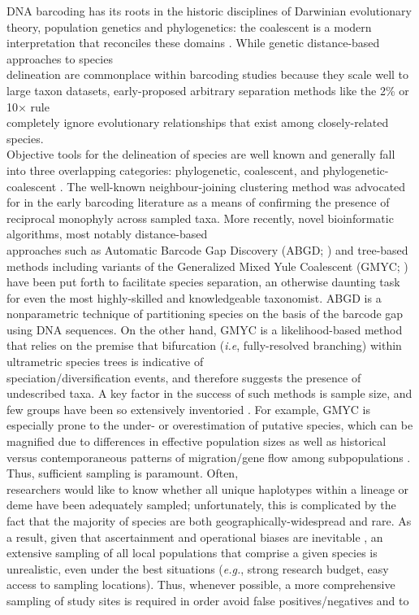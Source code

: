 DNA barcoding has its roots in the historic disciplines of Darwinian evolutionary \\ theory, population genetics and phylogenetics: the coalescent is a modern interpretation that reconciles these domains \cite{rosenberg2002genealogical}. While genetic distance-based approaches to species \\ delineation are commonplace within barcoding studies because they scale well to large taxon datasets, early-proposed arbitrary separation methods like the 2\% or 10$\times$ rule \\ completely ignore evolutionary relationships that exist among closely-related species. \\ Objective tools for the delineation of species are well known and generally fall into three overlapping categories: phylogenetic, coalescent, and phylogenetic-coalescent \cite{hubert2015dna}. The well-known neighbour-joining clustering method was advocated for in the early barcoding literature as a means of confirming the presence of reciprocal monophyly across sampled taxa. More recently, novel bioinformatic algorithms, most notably distance-based \\ approaches such as Automatic Barcode Gap Discovery (ABGD; \cite{puillandre2011abgd}) and tree-based \\ methods including variants of the Generalized Mixed Yule Coalescent (GMYC; \cite{monaghan2009accelerated, pons2006sequence}) have been put forth to facilitate species separation, an otherwise daunting task for even the most highly-skilled and knowledgeable taxonomist. ABGD is a nonparametric technique of partitioning species on the basis of the barcode gap using DNA sequences. On the other hand, GMYC is a likelihood-based method that relies on the premise that bifurcation (\textit{i.e}, fully-resolved branching) within ultrametric species trees is indicative of \\ speciation/diversification events, and therefore suggests the presence of undescribed taxa.  A key factor in the success of such methods is sample size, and few groups have been so extensively inventoried \cite{hubert2015dna}. For example, GMYC is especially prone to the under- or overestimation of putative species, which can be magnified due to differences in effective population sizes as well as historical versus contemporaneous patterns of migration/gene flow among subpopulations     \cite{lohse2009can, papadopoulou2009sampling}. Thus, sufficient sampling is paramount. Often, \\ researchers would like to know whether all unique haplotypes within a lineage or deme have been adequately sampled; unfortunately, this is complicated by the fact that the majority of species are both geographically-widespread and rare. As a result, given that ascertainment and operational biases are inevitable \cite{mutanen2016species}, an extensive sampling of all local populations that comprise a given species is unrealistic, even under the best situations (\textit{e.g.}, strong research budget, easy access to sampling locations). Thus, whenever possible, a more comprehensive sampling of study sites is required in order avoid false positives/negatives and to 